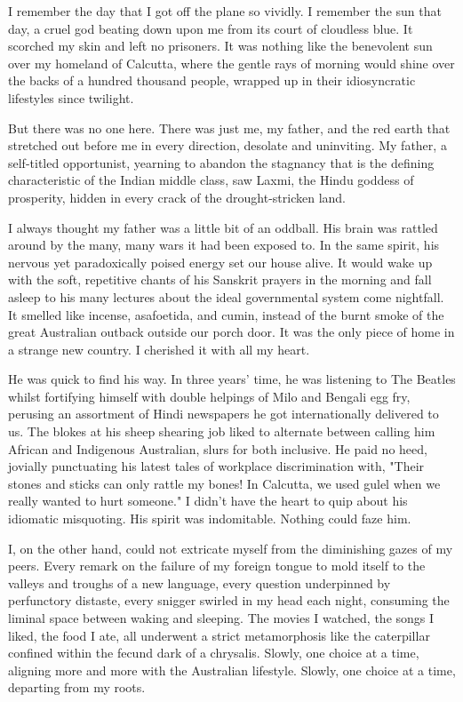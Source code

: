 \documentclass[a4paper]{article}
\begin{document}
I remember the day that I got off the plane so vividly. I remember the sun that day, a cruel god beating down upon me from its court of cloudless blue. It scorched my skin and left no prisoners. It was nothing like the benevolent sun over my homeland of Calcutta, where the gentle rays of morning would shine over the backs of a hundred thousand people, wrapped up in their idiosyncratic lifestyles since twilight.

But there was no one here. There was just me, my father, and the red earth that stretched out before me in every direction, desolate and uninviting. My father, a self-titled opportunist, yearning to abandon the stagnancy that is the defining characteristic of the Indian middle class, saw Laxmi, the Hindu goddess of prosperity, hidden in every crack of the drought-stricken land.

I always thought my father was a little bit of an oddball. His brain was rattled around by the many, many wars it had been exposed to. In the same spirit, his nervous yet paradoxically poised energy set our house alive. It would wake up with the soft, repetitive chants of his Sanskrit prayers in the morning and fall asleep to his many lectures about the ideal governmental system come nightfall. It smelled like incense, asafoetida, and cumin, instead of the burnt smoke of the great Australian outback outside our porch door. It was the only piece of home in a strange new country. I cherished it with all my heart.

He was quick to find his way. In three years' time, he was listening to The Beatles whilst fortifying himself with double helpings of Milo and Bengali egg fry, perusing an assortment of Hindi newspapers he got internationally delivered to us. The blokes at his sheep shearing job liked to alternate between calling him African and Indigenous Australian, slurs for both inclusive. He paid no heed, jovially punctuating his latest tales of workplace discrimination with, "Their stones and sticks can only rattle my bones! In Calcutta, we used gulel when we really wanted to hurt someone." I didn't have the heart to quip about his idiomatic misquoting. His spirit was indomitable. Nothing could faze him.

I, on the other hand, could not extricate myself from the diminishing gazes of my peers. Every remark on the failure of my foreign tongue to mold itself to the valleys and troughs of a new language, every question underpinned by perfunctory distaste, every snigger swirled in my head each night, consuming the liminal space between waking and sleeping. The movies I watched, the songs I liked, the food I ate, all underwent a strict metamorphosis like the caterpillar confined within the fecund dark of a chrysalis. Slowly, one choice at a time, aligning more and more with the Australian lifestyle. Slowly, one choice at a time, departing from my roots.
\end{document}
